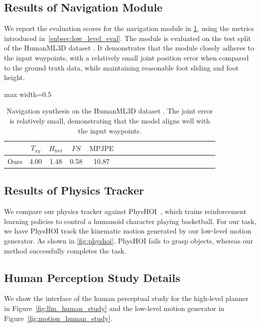 \subsection{Results of Navigation Module}
We report the evaluation scores for the navigation module in \cref{tab:navigation}, using the metrics introduced in~\cref{subsec:low_level_eval}. The module is evaluated on the test split of the HumanML3D dataset \cite{guo2022generating}. It demonstrates that the module closely adheres to the input waypoints, with a relatively small joint position error when compared to the ground truth data, while maintaining reasonable foot sliding and foot height.

\begin{table}[t]
\centering
\begin{adjustbox}{max width=0.5\textwidth}
\begin{tabular}{lcccccccccccccccccc}
\toprule
& $T_{xy}$ & $H_{\text{feet}}$ & $FS$ & $\text{MPJPE}$  \\
\midrule

Ours
& 4.00 & 1.48 & 0.58 & 10.87 \\
\bottomrule
\end{tabular}
\end{adjustbox}

\caption{Navigation synthesis on the HumanML3D dataset \cite{guo2022generating}. The joint error is relatively small, demonstrating that the model aligns well with the input waypoints.}
\label{tab:navigation}
\end{table}



\subsection{Results of Physics Tracker}
We compare our physics tracker against PhysHOI~\cite{wang2023physhoi}, which trains reinforcement learning policies to control a humanoid character playing basketball. 
For our task, we have PhysHOI track the kinematic motion generated by our low-level motion generator. As shown in \cref{fig:physhoi}, PhysHOI fails to grasp objects, whereas our method successfully completes the task.

\subsection{Human Perception Study Details}
We show the interface of the human perceptual study for the high-level planner in Figure~\ref{fig:llm_human_study} and the low-level motion generator in Figure~\ref{fig:motion_human_study}. 




